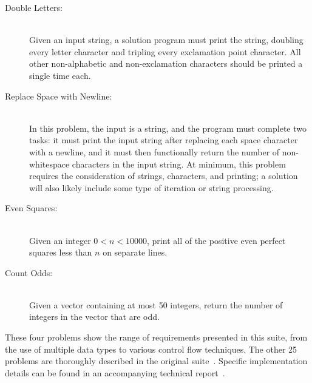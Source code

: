 \begin{description}

\item[Double Letters:] \ \\
Given an input string, a solution program must print the string, doubling every letter character and tripling every exclamation point character. All other non-alphabetic and non-exclamation characters should be printed a single time each.

\item[Replace Space with Newline:]  \ \\
In this problem, the input is a string, and the program must complete two tasks: it must print the input string after replacing each space character with a newline, and it must then functionally return the number of non-whitespace characters in the input string. At minimum, this problem requires the consideration of strings, characters, and printing; a solution will also likely include some type of iteration or string processing. 

\item[Even Squares:] \ \\
Given an integer $0 < n < 10000$, print all of the positive even perfect squares less than $n$ on separate lines.

\item[Count Odds:] \ \\
Given a vector containing at most 50 integers, return the number of integers in the vector that are odd.

\end{description}

These four problems show the range of requirements presented in this suite, from the use of multiple data types to various control flow techniques. The other 25 problems are thoroughly described in the original suite~\cite{Helmuth2015b}. Specific implementation details can be found in an accompanying technical report~\cite{Helmuth:2015006:UM}.


